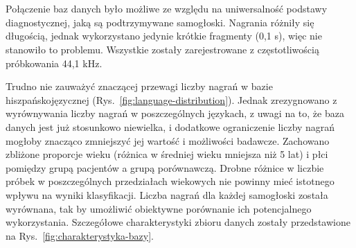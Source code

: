 \section*{}
Połączenie baz danych było możliwe ze względu na uniwersalność podstawy diagnostycznej, jaką są podtrzymywane samogłoski.
Nagrania różniły się długością, jednak wykorzystano jedynie krótkie fragmenty (0,1 s), więc nie stanowiło to problemu.
Wszystkie zostały zarejestrowane z częstotliwością próbkowania 44,1 kHz.

Trudno nie zauważyć znaczącej przewagi liczby nagrań w bazie hiszpańskojęzycznej (Rys.~\ref{fig:language-distribution}).
Jednak zrezygnowano z wyrównywania liczby nagrań w poszczególnych językach, z uwagi na to, że baza danych jest już stosunkowo niewielka, i dodatkowe ograniczenie liczby nagrań mogłoby znacząco zmniejszyć jej wartość i możliwości badawcze.
Zachowano zbliżone proporcje wieku (różnica w średniej wieku mniejsza niż 5 lat) i płci pomiędzy grupą pacjentów a grupą porównawczą.
Drobne różnice w liczbie próbek w poszczególnych przedziałach wiekowych nie powinny mieć istotnego wpływu na wyniki klasyfikacji.
Liczba nagrań dla każdej samogłoski została wyrównana, tak by umożliwić obiektywne porównanie ich potencjalnego wykorzystania.
Szczegółowe charakterystyki zbioru danych zostały przedstawione na Rys.~\ref{fig:charakterystyka-bazy}.



